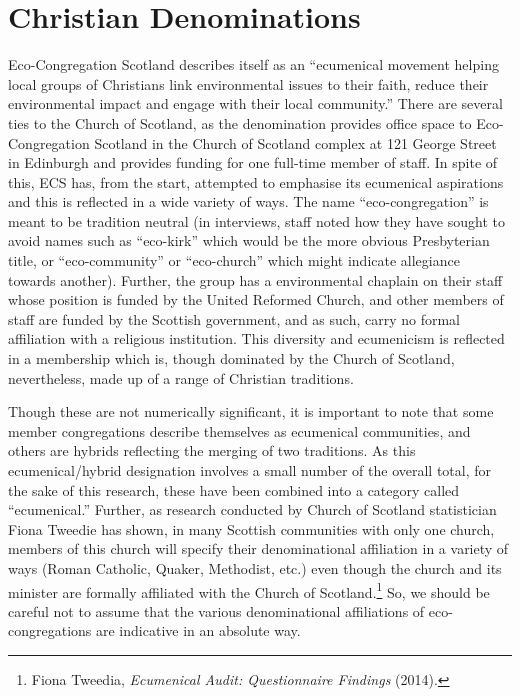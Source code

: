 \documentclass[11pt,]{article}
\let\rmarkdownfootnote\footnote%
\def\footnote{\protect\rmarkdownfootnote}
\begin{document}
\hypertarget{christian-denominations}{%
\section{Christian Denominations}\label{christian-denominations}}

Eco-Congregation Scotland describes itself as an ``ecumenical movement
helping local groups of Christians link environmental issues to their
faith, reduce their environmental impact and engage with their local
community.'' There are several ties to the Church of Scotland, as the
denomination provides office space to Eco-Congregation Scotland in the
Church of Scotland complex at 121 George Street in Edinburgh and
provides funding for one full-time member of staff. In spite of this,
ECS has, from the start, attempted to emphasise its ecumenical
aspirations and this is reflected in a wide variety of ways. The name
``eco-congregation'' is meant to be tradition neutral (in interviews,
staff noted how they have sought to avoid names such as ``eco-kirk''
which would be the more obvious Presbyterian title, or ``eco-community''
or ``eco-church'' which might indicate allegiance towards another).
Further, the group has a environmental chaplain on their staff whose
position is funded by the United Reformed Church, and other members of
staff are funded by the Scottish government, and as such, carry no
formal affiliation with a religious institution. This diversity and
ecumenicism is reflected in a membership which is, though dominated by
the Church of Scotland, nevertheless, made up of a range of Christian
traditions.

Though these are not numerically significant, it is important to note
that some member congregations describe themselves as ecumenical
communities, and others are hybrids reflecting the merging of two
traditions. As this ecumenical/hybrid designation involves a small
number of the overall total, for the sake of this research, these have
been combined into a category called ``ecumenical.'' Further, as
research conducted by Church of Scotland statistician Fiona Tweedie has
shown, in many Scottish communities with only one church, members of
this church will specify their denominational affiliation in a variety
of ways (Roman Catholic, Quaker, Methodist, etc.) even though the church
and its minister are formally affiliated with the Church of
Scotland.\footnote{Fiona Tweedia, \emph{Ecumenical Audit: Questionnaire
  Findings} (2014).} So, we should be careful not to assume that the
various denominational affiliations of eco-congregations are indicative
in an absolute way.
\end{document}
